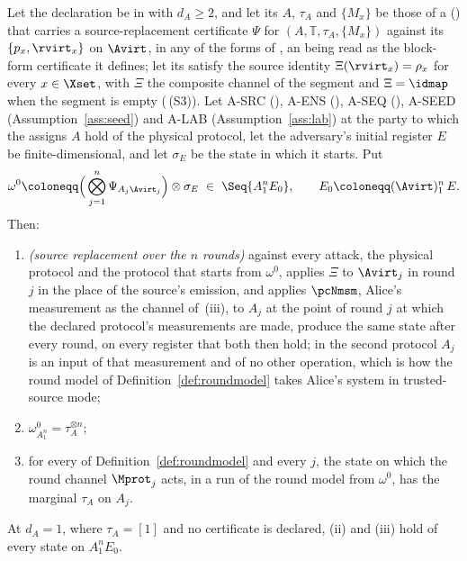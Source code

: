 \begin{lemma}\label{lem:product-marginal}
Let the declaration be in  with $d_A\ge2$, and let
its $A$, $\tau_A$ and $\{M_x\}$ be those of a 
() that carries a source-replacement
certificate $\Psi$ for $(A,\mathbb{T},\tau_A,\{M_x\})$ against its
 $\{p_x,\rvirt_x\}$ on $\Avirt$, in any of the forms of
, an  being read as
the block-form certificate it defines; let its  satisfy
the source identity $\Xi(\rvirt_x)=\rho_x$ for every $x\in\Xset$, with $\Xi$
the composite channel of the segment and $\Xi=\idmap$ when the segment is
empty (\,(S3)). Let A-SRC
(), A-ENS (), A-SEQ
(), A-SEED (Assumption~\ref{ass:seed})
and A-LAB (Assumption~\ref{ass:lab}) at the party to which the
 assigns $A$ hold of the physical protocol, let the
adversary's initial register $E$ be finite-dimensional, and let $\sigma_E$
be the state in which it starts. Put
\begin{equation}\label{eq:product-input}
  \omega^{0}\coloneqq\Big(\bigotimes_{j=1}^{n}\Psi_{A_j\Avirt_j}\Big)
  \otimes\sigma_E\ \in\ \Seq{A_1^nE_0},
  \qquad E_0\coloneqq(\Avirt)_1^n\,E .
\end{equation}
Then:
\begin{enumerate}[label=(\roman*),leftmargin=2.2em]
\item \emph{(source replacement over the $n$ rounds)} against every attack,
the physical protocol and the protocol that starts from $\omega^{0}$, applies
$\Xi$ to $\Avirt_j$ in round $j$ in the place of the source's emission, and
applies $\pcNmsm$, Alice's measurement as the channel of
\,(iii), to $A_j$ at the point of
round $j$ at which the declared protocol's measurements are made, produce
the same state after every round, on every register that both then hold; in
the second protocol $A_j$ is an input of that measurement and of no other
operation, which is how the round model of Definition~\ref{def:roundmodel}
takes Alice's system in trusted-source mode;
\item $\omega^{0}_{A_1^n}=\tau_A^{\otimes n}$;
\item for every  of Definition~\ref{def:roundmodel}
and every $j$, the state on which the round channel $\Mprot_j$ acts, in a run
of the round model from $\omega^{0}$, has the marginal $\tau_A$ on $A_j$.
\end{enumerate}
At $d_A=1$, where $\tau_A=[1]$ and no certificate is declared, (ii) and (iii)
hold of every state on $A_1^nE_0$.
\end{lemma}


